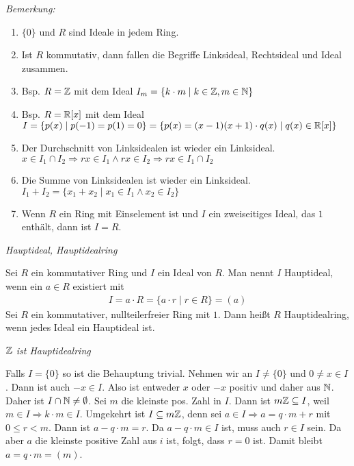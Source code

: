 \textit{Bemerkung:}
\begin{enumerate}
    \item $\{ 0 \}$ und $R$ sind Ideale in jedem Ring.
    \item Ist $R$ kommutativ, dann fallen die Begriffe Linksideal, Rechtsideal und Ideal zusammen.
    \item Bsp. $R = \mathbb{Z}$ mit dem Ideal $I_m = \left\{ k\cdot m \mid k\in \mathbb{Z}, m\in \mathbb{N} \right\}$
    \item Bsp. $R = \mathbb{R}[x]$ mit dem Ideal $I = \{ p(x) \mid p(-1) = p(1) = 0 \} = \{ p(x) = (x-1)(x+1) \cdot q(x) \mid q(x) \in \mathbb{R}[x] \}$
    \item Der Durchschnitt von Linksidealen ist wieder ein Linksideal.
        $x \in I_1 \cap I_2 \Rightarrow rx \in I_1 \wedge rx \in I_2 \Rightarrow rx \in I_1\cap I_2$
    \item Die Summe von Linksidealen ist wieder ein Linksideal.
        $I_1 + I_2 = \{ x_1 + x_2 \mid x_1 \in I_1 \wedge x_2 \in I_2\}$
    \item Wenn $R$ ein Ring mit Einselement ist und $I$ ein zweiseitiges Ideal, das $1$ enthält, dann ist $I=R$.
\end{enumerate}

\begin{mydef} \textit{Hauptideal, Hauptidealring}

    Sei $R$ ein kommutativer Ring und $I$ ein Ideal von $R$. Man nennt $I$ Hauptideal, wenn ein $a \in R$ existiert mit
    \begin{align*}
        I = a \cdot R = \{ a\cdot r \mid r\in R \} = (a)
    \end{align*}
    Sei $R$ ein kommutativer, nullteilerfreier Ring mit $1$. Dann heißt $R$ Hauptidealring, wenn jedes Ideal ein Hauptideal ist.
\end{mydef}


\begin{mylemma} \textit{$\mathbb{Z}$ ist Hauptidealring}

    Falls $I=\{ 0 \}$ so ist die Behauptung trivial. Nehmen wir an $I \neq \{ 0 \}$ und $0 \neq x \in I$. Dann ist auch $-x \in I$. Also ist entweder $x$ oder $-x$ positiv und daher aus $\mathbb{N}$. Daher ist $I \cap \mathbb{N} \neq \emptyset$.
    Sei $m$ die kleinste pos. Zahl in $I$. Dann ist $m \mathbb{Z} \subseteq I$, weil $m \in I \Rightarrow k \cdot m \in I$. Umgekehrt ist $I \subseteq m\mathbb{Z}$, denn sei $a \in I \Rightarrow a = q \cdot m + r$ mit $0 \leq r<m$. Dann ist $a-q\cdot m=r$. Da $a-q\cdot m \in I$ ist, muss auch $r \in I$ sein. Da aber $a$ die kleinste positive Zahl aus $i$ ist, folgt, dass $r=0$ ist. Damit bleibt $a=q\cdot m = (m)$.
\end{mylemma}

